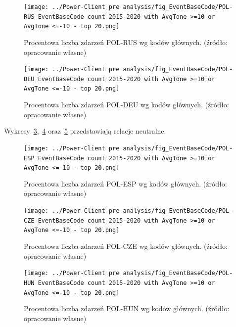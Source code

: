 \documentclass[11pt]{report}
\begin{document}
    \begin{figure}[!htp]
        \centering
        \texttt{[image: ../Power-Client pre analysis/fig\_EventBaseCode/POL-RUS EventBaseCode count 2015-2020 with AvgTone >=10 or AvgTone <=-10 - top 20.png]}
        \caption{Procentowa liczba zdarzeń POL-RUS wg kodów głównych. (źródło: opracowanie własne)}
        \label{fig:Power-Client:EBC:AvgToone10:POL-RUS}
    \end{figure}

    \begin{figure}[!htp]
        \centering
        \texttt{[image: ../Power-Client pre analysis/fig\_EventBaseCode/POL-DEU EventBaseCode count 2015-2020 with AvgTone >=10 or AvgTone <=-10 - top 20.png]}
        \caption{Procentowa liczba zdarzeń POL-DEU wg kodów głównych. (źródło: opracowanie własne)}
        \label{fig:Power-Client:EBC:AvgToone10:POL-DEU}
    \end{figure}

    Wykresy~\ref{fig:Power-Client:EBC:AvgToone10:POL-ESP},~\ref{fig:Power-Client:EBC:AvgToone10:POL-CZE} oraz~\ref{fig:Power-Client:EBC:AvgToone10:POL-HUN} przedstawiają relacje neutralne.
    \begin{figure}[!htp]
        \centering
        \texttt{[image: ../Power-Client pre analysis/fig\_EventBaseCode/POL-ESP EventBaseCode count 2015-2020 with AvgTone >=10 or AvgTone <=-10 - top 20.png]}
        \caption{Procentowa liczba zdarzeń POL-ESP wg kodów głównych. (źródło: opracowanie własne)}
        \label{fig:Power-Client:EBC:AvgToone10:POL-ESP}
    \end{figure}

    \begin{figure}[!htp]
        \centering
        \texttt{[image: ../Power-Client pre analysis/fig\_EventBaseCode/POL-CZE EventBaseCode count 2015-2020 with AvgTone >=10 or AvgTone <=-10 - top 20.png]}
        \caption{Procentowa liczba zdarzeń POL-CZE wg kodów głównych. (źródło: opracowanie własne)}
        \label{fig:Power-Client:EBC:AvgToone10:POL-CZE}
    \end{figure}

    \begin{figure}[!htp]
        \centering
        \texttt{[image: ../Power-Client pre analysis/fig\_EventBaseCode/POL-HUN EventBaseCode count 2015-2020 with AvgTone >=10 or AvgTone <=-10 - top 20.png]}
        \caption{Procentowa liczba zdarzeń POL-HUN wg kodów głównych. (źródło: opracowanie własne)}
        \label{fig:Power-Client:EBC:AvgToone10:POL-HUN}
    \end{figure}
\end{document}
